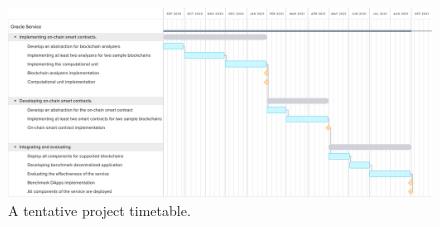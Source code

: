 


\begin{figure}[ht!]
  \begin{minipage}[b]{1\linewidth}
  \centering
        \includegraphics[width=1\linewidth]{figures/plan-details.png}
  \end{minipage}
  \caption{A tentative project timetable.}
  \label{fig:plan}
  \end{figure}
  


